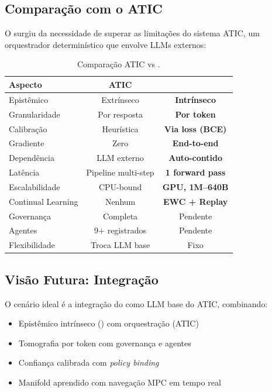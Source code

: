 \subsection{Compara\c{c}\~ao com o ATIC}

O \aletheion{} surgiu da necessidade de superar as limita\c{c}\~oes do
sistema ATIC, um orquestrador determin\'istico que envolve LLMs externos:

\begin{table}[H]
\centering
\caption{Compara\c{c}\~ao ATIC vs \aletheion{}.}
\label{tab:vs_atic}
\begin{tabular}{lcc}
\toprule
\textbf{Aspecto} & \textbf{ATIC} & \textbf{\aletheion{}} \\
\midrule
Epist\^emico & Extr\'inseco & \textbf{Intr\'inseco} \\
Granularidade & Por resposta & \textbf{Por token} \\
Calibra\c{c}\~ao & Heur\'istica & \textbf{Via loss (BCE)} \\
Gradiente & Zero & \textbf{End-to-end} \\
Depend\^encia & LLM externo & \textbf{Auto-contido} \\
Lat\^encia & Pipeline multi-step & \textbf{1 forward pass} \\
Escalabilidade & CPU-bound & \textbf{GPU, 1M--640B} \\
Continual Learning & Nenhum & \textbf{EWC + Replay} \\
\midrule
Governan\c{c}a & Completa & Pendente \\
Agentes & 9+ registrados & Pendente \\
Flexibilidade & Troca LLM base & Fixo \\
\bottomrule
\end{tabular}
\end{table}

\subsection{Vis\~ao Futura: Integra\c{c}\~ao}

O cen\'ario ideal \'e a integra\c{c}\~ao do \aletheion{} como LLM base do ATIC,
combinando:

\begin{itemize}
    \item Epist\^emico intr\'inseco (\aletheion{}) com orquestra\c{c}\~ao (ATIC)
    \item Tomografia por token com governan\c{c}a e agentes
    \item Confian\c{c}a calibrada com \textit{policy binding}
    \item Manifold aprendido com navega\c{c}\~ao MPC em tempo real
\end{itemize}

